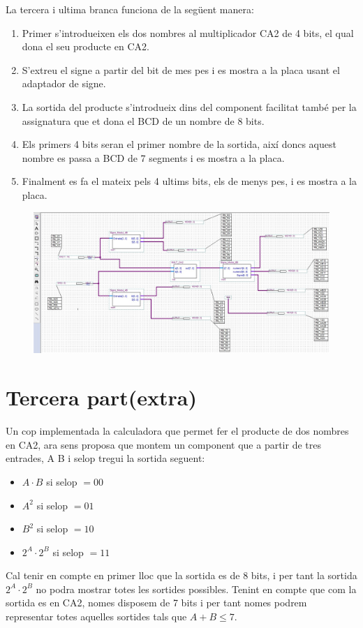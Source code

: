 \documentclass[12pt, a4papre]{article}
\begin{document}
	La tercera i ultima branca funciona de la següent manera:
	\begin{enumerate}
	\item Primer s'introdueixen els dos nombres al multiplicador CA2 de 4 bits, el qual dona el seu producte en CA2.
	\item S'extreu el signe a partir del bit de mes pes i es mostra a la placa usant el adaptador de signe.
	\item La sortida del producte s'introdueix dins del component facilitat també per la assignatura que et dona el BCD de un nombre de 8 bits.
	\item Els primers 4 bits seran el primer nombre de la sortida, així doncs aquest nombre es passa a BCD de 7 segments i es mostra a la placa.
	\item Finalment es fa el mateix pels 4 ultims bits, els de menys pes, i es mostra a la placa.
	\end{enumerate}
	
	\begin{center}
	\begin{figure}[H]
		\begin{center}
		\includegraphics[width=150mm]{multFinal.jpeg}
		\end{center}
	\end{figure}
	
	\end{center}
	
	\newpage
	\section{Tercera part(extra)}
	
	Un cop implementada la calculadora que permet fer el producte de dos nombres en CA2, ara sens proposa que montem un component que a partir de tres entrades, A B i selop tregui la sortida seguent:
	
	\begin{itemize}
	\item $A\cdot B$ si selop $=00$
	\item $A^2$ si selop $=01$
	\item $B^2$ si selop $=10$
	\item$2^A\cdot2^B$ si selop $=11$
	\end{itemize}
	
	Cal tenir en compte en primer lloc que la sortida es de 8 bits, i per tant la sortida $2^A\cdot2^B$ no podra mostrar totes les sortides possibles. Tenint en compte que com la sortida es en CA2, nomes disposem de 7 bits i per tant nomes podrem representar totes aquelles sortides tals que $A+B \leqslant 7$. 
	
\end{document}
